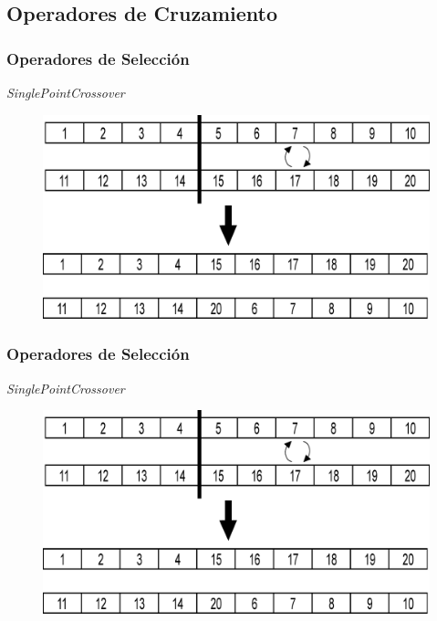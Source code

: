 \documentclass[9pt]{beamer}
\begin{document}
    \subsection{Operadores de Cruzamiento}
    \begin{frame}
        \frametitle{Operadores de Selección}
        \textit{SinglePointCrossover}

        \begin{figure}
            \includegraphics[width=\textwidth]{assets/Anexo/Crossover.eps}
        \end{figure}

    \end{frame}
    \begin{frame}
        \frametitle{Operadores de Selección}
        \textit{SinglePointCrossover}

        \begin{figure}
            \includegraphics[width=\textwidth]{assets/Anexo/Crossover.eps}
        \end{figure}

    \end{frame}
\end{document}
